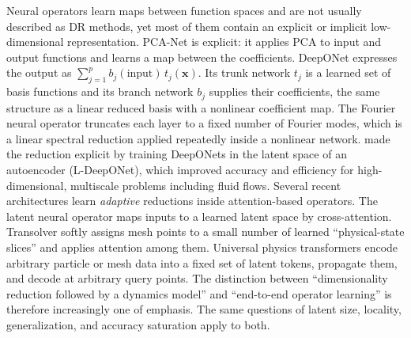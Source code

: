 Neural operators learn maps between function spaces
\parencite{kovachki2023neural} and are not usually described as DR methods, yet
most of them contain an explicit or implicit low-dimensional representation.
PCA-Net \parencite{bhattacharya2021pcanet} is explicit: it applies PCA to input
and output functions and learns a map between the coefficients. DeepONet
\parencite{lu2021deeponet} expresses the output as
$\sum_{j=1}^{p}b_j(\text{input})\,t_j(\bm{x})$. Its trunk network $t_j$ is a
learned set of basis functions and its branch network $b_j$ supplies their
coefficients, the same structure as a linear reduced basis with a nonlinear
coefficient map. The Fourier neural operator \parencite{li2021fno} truncates
each layer to a fixed number of Fourier modes, which is a linear spectral
reduction applied repeatedly inside a nonlinear network.
\textcite{kontolati2024latent} made the reduction explicit by training
DeepONets in the latent space of an autoencoder (L-DeepONet), which improved
accuracy and efficiency for high-dimensional, multiscale problems including
fluid flows. Several recent architectures learn \emph{adaptive}
reductions inside attention-based operators. The latent neural operator
\parencite{wang2024lno} maps inputs to a learned latent space by cross-attention.
Transolver \parencite{wu2024transolver} softly assigns mesh points to a small
number of learned ``physical-state slices'' and applies attention among them.
Universal physics transformers \parencite{alkin2024upt} encode arbitrary
particle or mesh data into a fixed set of latent tokens, propagate them, and
decode at arbitrary query points. The distinction between ``dimensionality
reduction followed by a dynamics model'' and ``end-to-end operator learning''
is therefore increasingly one of emphasis. The same questions of latent size,
locality, generalization, and accuracy saturation apply to both.
